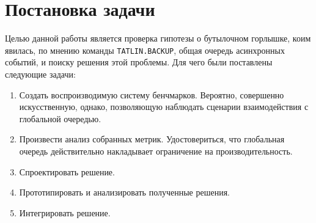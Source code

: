 
\section{Постановка задачи}
\label{sec:task}

Целью данной работы является проверка гипотезы о бутылочном горлышке, коим явилась, по мнению команды \verb|TATLIN.BACKUP|, общая очередь асинхронных событий, и поиску решения этой проблемы. Для чего были поставлены следующие задачи:

\begin{enumerate}
    \item Создать воспроизводимую систему бенчмарков. Вероятно, совершенно искусственную, однако, позволяющую наблюдать сценарии взаимодействия с глобальной очередью.
    \item Произвести анализ собранных метрик. Удостовериться, что глобальная очередь действительно накладывает ограничение на производительность.
    \item Спроектировать решение.
    \item Прототипировать и анализировать полученные решения.
    \item Интегрировать решение.
\end{enumerate}
